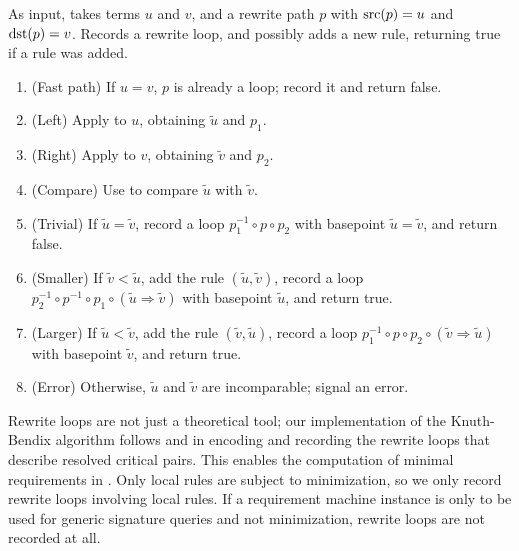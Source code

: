 \documentclass[../generics]{subfiles}
\begin{document}
\begin{algorithm}\label{add rule derived algo}
As input, takes terms $u$ and $v$, and a rewrite path $p$ with $\operatorname{src}(p)=u$ and $\operatorname{dst}(p)=v$. Records a rewrite loop, and possibly adds a new rule, returning true if a rule was added.
\begin{enumerate}
\item (Fast path) If $u=v$, $p$ is already a loop; record it and return false.
\item (Left) Apply  to $u$, obtaining $\tilde{u}$ and $p_1$.
\item (Right) Apply  to $v$, obtaining $\tilde{v}$ and $p_2$.
\item (Compare) Use  to compare $\tilde{u}$ with $\tilde{v}$.
\item (Trivial) If $\tilde{u}=\tilde{v}$, record a loop $p_1^{-1}\circ p\circ p_2$ with basepoint $\tilde{u}=\tilde{v}$, and return false.
\item (Smaller) If $\tilde{v}<\tilde{u}$, add the rule $(\tilde{u}, \tilde{v})$, record a loop $p_2^{-1}\circ p^{-1}\circ p_1\circ (\tilde{u}\Rightarrow \tilde{v})$ with basepoint $\tilde{u}$, and return true.
\item (Larger) If $\tilde{u}<\tilde{v}$, add the rule $(\tilde{v}, \tilde{u})$, record a loop $p_1^{-1}\circ p \circ p_2 \circ (\tilde{v}\Rightarrow \tilde{u})$ with basepoint $\tilde{v}$, and return true.
\item (Error) Otherwise, $\tilde{u}$ and $\tilde{v}$ are incomparable; signal an error.
\end{enumerate}
\end{algorithm}
Rewrite loops are not just a theoretical tool; our implementation of the Knuth-Bendix algorithm follows \cite{loggedrewriting} and \cite{homotopicalcompletion} in encoding and recording the rewrite loops that describe resolved critical pairs. This enables the computation of minimal requirements in . Only local rules are subject to minimization, so we only record rewrite loops involving local rules. If a requirement machine instance is only to be used for generic signature queries and not minimization, rewrite loops are not recorded at all.
\end{document}
